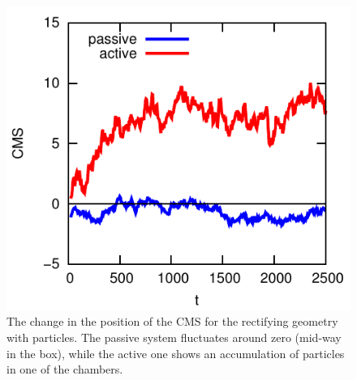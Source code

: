 \documentclass[aip,jcp,reprint,a4paper,onecolumn,amsmath]{revtex4-1}
\begin{document}
\begin{figure}[!htb]
\begin{center}
\includegraphics[scale=1.0]{FIGURES/rectification}
\end{center}
\caption{\label{fig:rectification}The change in the position of the CMS for the rectifying geometry with particles. The passive system fluctuates around zero (mid-way in the box), while the active one shows an accumulation of particles in one of the chambers.}
\end{figure}
\end{document}
